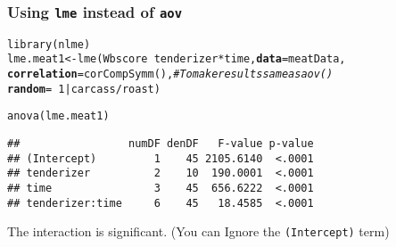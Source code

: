 \documentclass[color=usenames,dvipsnames]{beamer}\usepackage[]{graphicx}\usepackage[]{color}
\makeatletter
\newcommand{\hlnum}[1]{\textcolor[rgb]{0.69,0.494,0}{#1}}%
\newcommand{\hlcom}[1]{\textcolor[rgb]{0.514,0.506,0.514}{\textit{#1}}}%
\newcommand{\hlopt}[1]{\textcolor[rgb]{0,0,0}{#1}}%
\newcommand{\hlstd}[1]{\textcolor[rgb]{0,0,0}{#1}}%
\newcommand{\hlkwb}[1]{\textcolor[rgb]{0,0.341,0.682}{#1}}%
\newcommand{\hlkwc}[1]{\textcolor[rgb]{0,0,0}{\textbf{#1}}}%
\newcommand{\hlkwd}[1]{\textcolor[rgb]{0.004,0.004,0.506}{#1}}%
\newenvironment{kframe}{%
 \def\at@end@of@kframe{}%
 \ifinner\ifhmode%
  \def\at@end@of@kframe{\end{minipage}}%
  \begin{minipage}{\columnwidth}%
 \fi\fi%
 \def\FrameCommand##1{\hskip\@totalleftmargin \hskip-\fboxsep
 \colorbox{shadecolor}{##1}\hskip-\fboxsep
     \hskip-\linewidth \hskip-\@totalleftmargin \hskip\columnwidth}%
 \MakeFramed {\advance\hsize-\width
   \@totalleftmargin\z@ \linewidth\hsize
   \@setminipage}}%
 {\par\unskip\endMakeFramed%
 \at@end@of@kframe}
\newenvironment{knitrout}{}{} %
\makeatother
\begin{document}
\begin{frame}[fragile]
  \frametitle{Using {\tt lme} instead of {\tt aov}}
\small
\begin{knitrout}\footnotesize
{}\color{fgcolor}\begin{kframe}
\begin{alltt}
\hlkwd{library}\hlstd{(nlme)}
\hlstd{lme.meat1} \hlkwb{<-} \hlkwd{lme}\hlstd{(Wbscore} \hlopt{~} \hlstd{tenderizer}\hlopt{*}\hlstd{time,} \hlkwc{data}\hlstd{=meatData,}
    \hlkwc{correlation}\hlstd{=}\hlkwd{corCompSymm}\hlstd{(),} \hlcom{# To make results same as aov()}
    \hlkwc{random} \hlstd{=} \hlopt{~}\hlnum{1}\hlopt{|}\hlstd{carcass}\hlopt{/}\hlstd{roast)}
\end{alltt}
\end{kframe}
\end{knitrout}
\pause
\begin{knitrout}\footnotesize
{}\color{fgcolor}\begin{kframe}
\begin{alltt}
\hlkwd{anova}\hlstd{(lme.meat1)}
\end{alltt}
\begin{verbatim}
##                 numDF denDF   F-value p-value
## (Intercept)         1    45 2105.6140  <.0001
## tenderizer          2    10  190.0001  <.0001
## time                3    45  656.6222  <.0001
## tenderizer:time     6    45   18.4585  <.0001
\end{verbatim}
\end{kframe}
\end{knitrout}
The interaction is significant. (You can Ignore the {\tt (Intercept)} term)
\end{frame}
\end{document}
